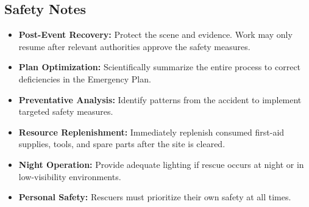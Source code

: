 \documentclass[11pt, a4paper]{article}
\begin{document}
\subsection*{Safety Notes}
\begin{tcolorbox}[colback=red!5!white,colframe=red!75!black,title=Critical Warnings]
\begin{itemize}[leftmargin=1.2em, nosep]
    \item \textbf{Post-Event Recovery:} Protect the scene and evidence. Work may only resume after relevant authorities approve the safety measures.
    \item \textbf{Plan Optimization:} Scientifically summarize the entire process to correct deficiencies in the Emergency Plan.
    \item \textbf{Preventative Analysis:} Identify patterns from the accident to implement targeted safety measures.
    \item \textbf{Resource Replenishment:} Immediately replenish consumed first-aid supplies, tools, and spare parts after the site is cleared.
    \item \textbf{Night Operation:} Provide adequate lighting if rescue occurs at night or in low-visibility environments.
    \item \textbf{Personal Safety:} Rescuers must prioritize their own safety at all times.
\end{itemize}
\end{tcolorbox}
\end{document}
